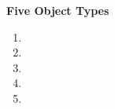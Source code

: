 \documentclass[11pt]{report}
\begin{document}
\begin{enumerate}
  \vspace*{.1in}
  {\bf Five Object Types}
  \begin{enumerate}
  \setlength{\itemsep}{.25in}
    \item 
    \item 
    \item
    \item
    \item
  \end{enumerate}

      
      
      
      
      
      
      
      
      
      
      
   


\end{enumerate}
 
\end{document}
